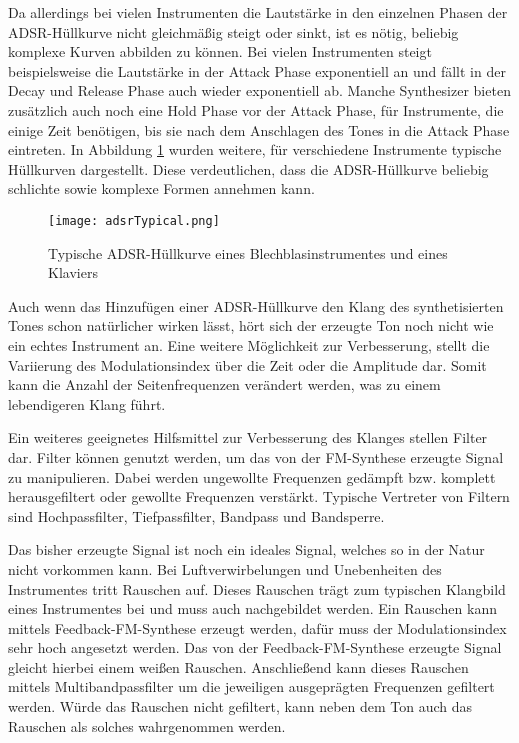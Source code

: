 Da allerdings bei vielen Instrumenten die Lautstärke in den einzelnen Phasen der ADSR-Hüllkurve nicht gleichmäßig steigt oder sinkt, ist es nötig, beliebig komplexe Kurven abbilden zu können. Bei vielen Instrumenten steigt beispielsweise die Lautstärke in der Attack Phase exponentiell an und fällt in der Decay und Release Phase auch wieder exponentiell ab. Manche Synthesizer bieten zusätzlich auch noch eine Hold Phase vor der Attack Phase, für Instrumente, die einige Zeit benötigen, bis sie nach dem Anschlagen des Tones in die Attack Phase eintreten. In Abbildung \ref{fig:adsrTypical} wurden weitere, für verschiedene Instrumente typische Hüllkurven dargestellt. Diese verdeutlichen, dass die ADSR-Hüllkurve beliebig schlichte sowie komplexe Formen annehmen kann.

\begin{figure} [ht]
\centering
  \texttt{[image: adsrTypical.png]}
\caption{Typische ADSR-Hüllkurve eines Blechblasinstrumentes \cite{chowningPaper} und eines Klaviers}
\label{fig:adsrTypical} 
\end{figure}

Auch wenn das Hinzufügen einer ADSR-Hüllkurve den Klang des synthetisierten Tones schon natürlicher wirken lässt, hört sich der erzeugte Ton noch nicht wie ein echtes Instrument an. Eine weitere Möglichkeit zur Verbesserung, stellt die Variierung des Modulationsindex über die Zeit oder die Amplitude dar. Somit kann die Anzahl der Seitenfrequenzen verändert werden, was zu einem lebendigeren Klang führt. \cite[S. 532]{chowningPaper}

Ein weiteres geeignetes Hilfsmittel zur Verbesserung des Klanges stellen Filter dar. Filter können genutzt werden, um das von der FM-Synthese erzeugte Signal zu manipulieren. Dabei werden ungewollte Frequenzen gedämpft bzw. komplett herausgefiltert oder gewollte Frequenzen verstärkt. Typische Vertreter von Filtern sind Hochpassfilter, Tiefpassfilter, Bandpass und Bandsperre. \cite[S. 100-104]{stotz}

Das bisher erzeugte Signal ist noch ein ideales Signal, welches so in der Natur nicht vorkommen kann. Bei Luftverwirbelungen und Unebenheiten des Instrumentes tritt Rauschen auf. Dieses Rauschen trägt zum typischen Klangbild eines Instrumentes bei und muss auch nachgebildet werden. Ein Rauschen kann mittels Feedback-FM-Synthese erzeugt werden, dafür muss der Modulationsindex sehr hoch angesetzt werden. Das von der Feedback-FM-Synthese erzeugte Signal gleicht hierbei einem weißen Rauschen. Anschließend kann dieses Rauschen mittels Multibandpassfilter um die jeweiligen ausgeprägten Frequenzen gefiltert werden. Würde das Rauschen nicht gefiltert, kann neben dem Ton auch das Rauschen als solches wahrgenommen werden. \cite[S. 152]{barkowsky}

